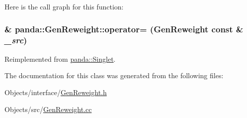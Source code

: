 Here is the call graph for this function:\hypertarget{classpanda_1_1GenReweight_a6dd54fb7e34a557beaf06698662a6831}{
\subsubsection[{operator=}]{ \& panda::GenReweight::operator= ({\bf GenReweight} const \& {\em \_\-src})}}
\label{classpanda_1_1GenReweight_a6dd54fb7e34a557beaf06698662a6831}


Reimplemented from \hyperlink{classpanda_1_1Singlet_a161b3df14c430fd7f1afdd64d098b211}{panda::Singlet}.

The documentation for this class was generated from the following files:\begin{DoxyCompactItemize}
\item 
Objects/interface/\hyperlink{GenReweight_8h}{GenReweight.h}\item 
Objects/src/\hyperlink{GenReweight_8cc}{GenReweight.cc}\end{DoxyCompactItemize}
